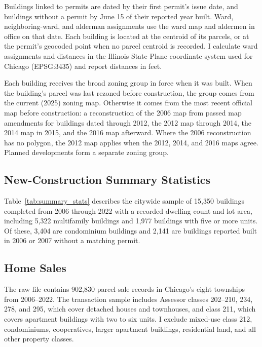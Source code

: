 Buildings linked to permits are dated by their first permit's issue date, and buildings without a permit by June 15 of their reported year built.
Ward, neighboring-ward, and alderman assignments use the ward map and aldermen in office on that date.
Each building is located at the centroid of its parcels, or at the permit's geocoded point when no parcel centroid is recorded.
I calculate ward assignments and distances in the Illinois State Plane coordinate system used for Chicago (EPSG:3435) and report distances in feet.

Each building receives the broad zoning group in force when it was built.
When the building's parcel was last rezoned before construction, the group comes from the current (2025) zoning map.
Otherwise it comes from the most recent official map before construction: a reconstruction of the 2006 map from passed map amendments for buildings dated through 2012, the 2012 map through 2014, the 2014 map in 2015, and the 2016 map afterward.
Where the 2006 reconstruction has no polygon, the 2012 map applies when the 2012, 2014, and 2016 maps agree.
Planned developments form a separate zoning group.

\subsection{New-Construction Summary Statistics}
\label{subsec:new_construction_summary_stats}

Table~\ref{tab:summary_stats} describes the citywide sample of 15,350 buildings completed from 2006 through 2022 with a recorded dwelling count and lot area, including 5,322 multifamily buildings and 1,977 buildings with five or more units.
Of these, 3,404 are condominium buildings and 2,141 are buildings reported built in 2006 or 2007 without a matching permit.

\subsection{Home Sales}
\label{subsec:sales_sample}

The raw file contains 902,830 parcel-sale records in Chicago's eight townships from 2006--2022.
The transaction sample includes Assessor classes 202--210, 234, 278, and 295, which cover detached houses and townhouses, and class 211, which covers apartment buildings with two to six units.
I exclude mixed-use class 212, condominiums, cooperatives, larger apartment buildings, residential land, and all other property classes.

